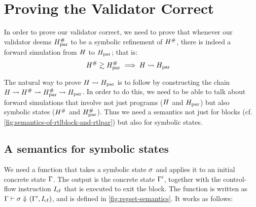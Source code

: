 {\section{Proving the Validator Correct}%
\label{sec:hs:overview-validator-correctness-proof}

In order to prove our validator correct, we need to prove that whenever our
validator deems $H_\text{par}^{\#}$ to be a symbolic refinement of
$H^{\#}$, there is indeed a forward simulation from $H$ to
$H_\text{par}$; that is:
  \begin{equation}
    H^{\#} \gtrsim H_\text{par}^{\#} \implies H \mathrel{\leadsto} H_\text{par}
  \end{equation}

  The natural way to prove $H \mathrel{\leadsto} H_\text{par}$ is to follow
  \textcite{tristan08_formal_verif_trans_valid} by constructing the chain
  $H \mathrel{\leadsto} H^{\#} \mathrel{\leadsto} H_\text{par}^{\#} \mathrel{\leadsto} H_\text{par}$. In
  order to do this, we need to be able to talk about forward simulations that
  involve not just programs ($H$ and $H_\text{par}$) but also symbolic states
  ($H^{\#}$ and $H_\text{par}^{\#}$). Thus we need a semantics not
  just for blocks (cf. \cref{fig:semantics-of-rtlblock-and-rtlpar}) but also for
  symbolic states.

\subsection{A semantics for symbolic states}

We need a function that takes a symbolic state $\sigma$ and applies it to an
initial concrete state $\Gamma$. The output is the concrete state $\Gamma'$,
together with the control-flow instruction $I_{\mathrm{cf}}$ that is executed to exit
the block. The function is written as
$\Gamma \vdash \sigma \Downarrow_{} (\Gamma',I_{\mathrm{cf}})$, and is defined in
\cref{fig:regset-semantics}. It works as follows:


}
